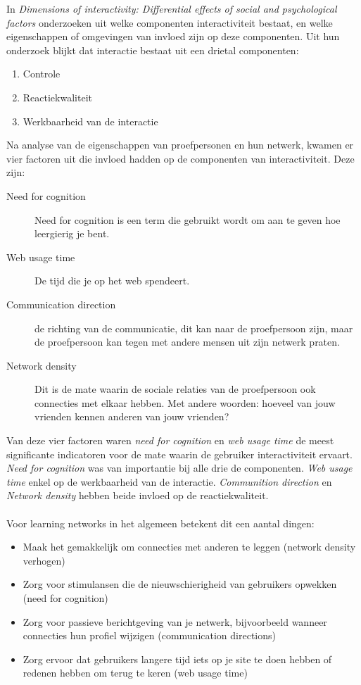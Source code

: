 \documentclass[a4paper, 10pt, pdftex]{report}
\begin{document}
      In \emph{Dimensions of interactivity: Differential effects of social and psychological factors} onderzoeken \citeauthor{Sohn2005} uit welke componenten interactiviteit bestaat, en welke eigenschappen of omgevingen van invloed zijn op deze componenten. Uit hun onderzoek blijkt dat interactie bestaat uit een drietal componenten:
        \begin{enumerate}
          \item Controle
          \item Reactiekwaliteit
          \item Werkbaarheid van de interactie
        \end{enumerate}
      Na analyse van de eigenschappen van proefpersonen en hun netwerk, kwamen er vier factoren uit die invloed hadden op de componenten van interactiviteit. Deze zijn:
        \begin{description}
          \item[Need for cognition]
            Need for cognition is een term die gebruikt wordt om aan te geven hoe leergierig je bent.
          \item[Web usage time]
            De tijd die je op het web spendeert.
          \item[Communication direction]
            de richting van de communicatie, dit kan naar de proefpersoon zijn, maar de proefpersoon kan tegen met andere mensen uit zijn netwerk praten.
          \item[Network density]
            Dit is de mate waarin de sociale relaties van de proefpersoon ook connecties met elkaar hebben. Met andere woorden: hoeveel van jouw vrienden kennen anderen van jouw vrienden?
        \end{description}
        Van deze vier factoren waren \emph{need for cognition} en \emph{web usage time} de meest significante indicatoren voor de mate waarin de gebruiker interactiviteit ervaart. \emph{Need for cognition} was van importantie bij alle drie de componenten. \emph{Web usage time} enkel op de werkbaarheid van de interactie. \emph{Communition direction} en \emph{Network density} hebben beide invloed op de reactiekwaliteit.

        \paragraph{}
        Voor learning networks in het algemeen betekent dit een aantal dingen:
        \begin{itemize}
          \item Maak het gemakkelijk om connecties met anderen te leggen (network density verhogen)
          \item Zorg voor stimulansen die de nieuwschierigheid van gebruikers opwekken (need for cognition)
          \item Zorg voor passieve berichtgeving van je netwerk, bijvoorbeeld wanneer connecties hun profiel wijzigen (communication directions)
          \item Zorg ervoor dat gebruikers langere tijd iets op je site te doen hebben of redenen hebben om terug te keren (web usage time)
        \end{itemize}
\end{document}
